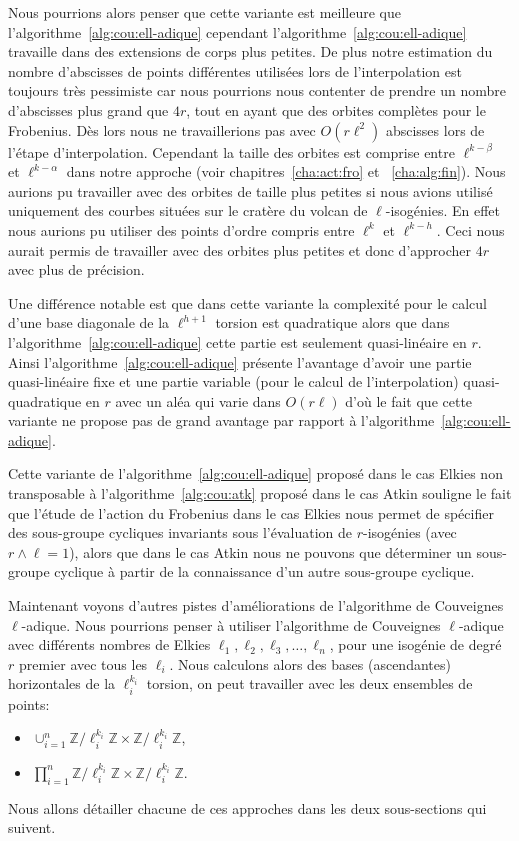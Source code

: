 \documentclass[10pt,a4paper]{book}
\theoremstyle{plain}
\theoremstyle{definition}
\theoremstyle{definition}
\theoremstyle{definition}
\theoremstyle{definition}
\theoremstyle{definition}
\theoremstyle{remark}
\theoremstyle{remark}
\theoremstyle{definition}
\begin{document}
Nous pourrions alors penser que cette variante est meilleure que 
l'algorithme~\ref{alg:cou:ell-adique} cependant 
l'algorithme~\ref{alg:cou:ell-adique} travaille dans des extensions de corps 
plus petites. De plus notre estimation du nombre d'abscisses de points 
différentes utilisées lors de l'interpolation est toujours très pessimiste car 
nous pourrions nous contenter de prendre un nombre d'abscisses plus grand que 
$4r$, tout en ayant que des orbites complètes pour le Frobenius. Dès lors nous 
ne travaillerions pas avec $O(r\ell^2)$ abscisses lors de l'étape 
d'interpolation. Cependant la taille des orbites est comprise entre 
$\ell^{k-\beta}$ et $\ell^{k-\alpha}$ dans notre approche (voir 
chapitres~\ref{cha:act:fro} et ~\ref{cha:alg:fin}). Nous aurions pu travailler 
avec des orbites de taille plus petites si nous avions utilisé uniquement des 
courbes situées sur le cratère du volcan de $\ell$-isogénies. En effet nous 
aurions pu utiliser des points d'ordre compris entre $\ell^{k}$ et 
$\ell^{k-h}$. Ceci nous aurait permis de travailler avec des orbites plus 
petites et donc d'approcher $4r$ avec plus de précision.

Une différence notable est que dans cette variante la complexité pour le 
calcul d'une base diagonale de la $\ell^{h+1}$ torsion est quadratique alors 
que dans l'algorithme~\ref{alg:cou:ell-adique} cette partie est seulement 
quasi-linéaire en $r$.  Ainsi l'algorithme~\ref{alg:cou:ell-adique} présente
l'avantage d'avoir une partie quasi-linéaire fixe et une partie variable (pour 
le calcul de l'interpolation) quasi-quadratique en $r$ avec un aléa qui varie 
dans $O(r\ell)$ d'où le fait que cette variante ne propose pas de grand 
avantage par rapport à l'algorithme~\ref{alg:cou:ell-adique}.
\newline

Cette variante de l'algorithme~\ref{alg:cou:ell-adique}  proposé dans le cas 
Elkies non transposable à l'algorithme~\ref{alg:cou:atk} proposé dans le cas 
Atkin souligne le fait que l'étude de l'action du Frobenius dans le cas Elkies 
nous permet de spécifier des sous-groupe cycliques invariants sous l'évaluation de 
$r$-isogénies (avec $r \wedge \ell = 1$), alors que dans le cas Atkin nous ne 
pouvons que déterminer un sous-groupe cyclique à partir de la connaissance d'un 
autre sous-groupe cyclique.

Maintenant voyons d'autres pistes d'améliorations de l'algorithme de Couveignes
$\ell$-adique.
Nous pourrions penser à utiliser l'algorithme de Couveignes $\ell$-adique avec 
différents nombres de Elkies $\ell_1, \ell_2, \ell_3, \dots, \ell_{n}$, pour 
une isogénie de degré $r$ premier avec tous les $\ell_i$. Nous 
calculons alors des bases (ascendantes) horizontales de la $\ell_i^{k_i}$ torsion, on peut 
travailler avec les deux ensembles de points:
\begin{itemize}
\item $\cup_{i=1}^n \mathbb{Z}/\ell_i^{k_i} \mathbb{Z} \times \mathbb{Z}/\ell_i^{k_i} \mathbb{Z}$, 
\item $\prod_{i=1}^n \mathbb{Z}/\ell_i^{k_i} \mathbb{Z} \times \mathbb{Z}/\ell_i^{k_i} \mathbb{Z} $.
\end{itemize}
Nous allons détailler chacune de ces approches dans les deux sous-sections qui suivent.
\end{document}
